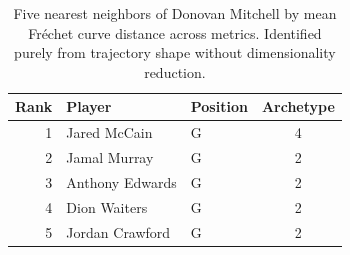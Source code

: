 \begin{table}[htbp]
  \centering\small
  \begin{tabular}{rllc}
    \toprule
    Rank & Player & Position & Archetype \\
    \midrule
    1 & Jared McCain & G & 4 \\
    2 & Jamal Murray & G & 2 \\
    3 & Anthony Edwards & G & 2 \\
    4 & Dion Waiters & G & 2 \\
    5 & Jordan Crawford & G & 2 \\
    \bottomrule
  \end{tabular}
  \caption{Five nearest neighbors of Donovan Mitchell by mean Fr\'{e}chet curve distance across metrics. Identified purely from trajectory shape without dimensionality reduction.}
  \label{tab:Donovan_Mitchell_frechet_curve_neighbors}
\end{table}

